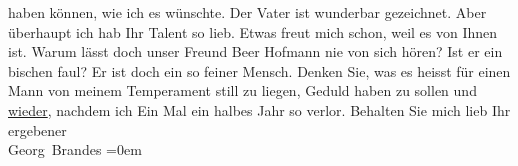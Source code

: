 \begin{ledgroupsized}[t]{13cm}
               haben können, {\pb}wie ich es
               wünschte. Der Vater ist wunderbar gezeichnet. Aber überhaupt ich hab Ihr Talent so
               lieb. Etwas freut mich schon, weil es von Ihnen ist.\pend
           \pstart
           Warum lässt doch unser Freund Beer Hofmann nie
               von sich hören? Ist er ein bischen faul? Er ist doch ein so feiner Mensch.\pend
           \pstart
           Denken Sie, was es heisst für einen Mann von meinem Temperament still zu liegen,
               Geduld haben zu sollen und \uline{wieder}, nachdem ich Ein
               Mal ein halbes Jahr so verlor.\pend
           \pstart
           Behalten Sie mich lieb\pend
           \pstart
           Ihr ergebener{\\[\baselineskip]}\spacefill\mbox{Georg Brandes}\pend
           \leftskip=0em{}
         
         \endnumbering{}\end{ledgroupsized}  \newcommand{\dateiname}{L00876}\newcommand{\titel}{Georg Brandes an Arthur Schnitzler, 7. 1. 1899}\newcommand{\editorInnen}{Martin Anton Müller und Gerd-Hermann Susen}
      
